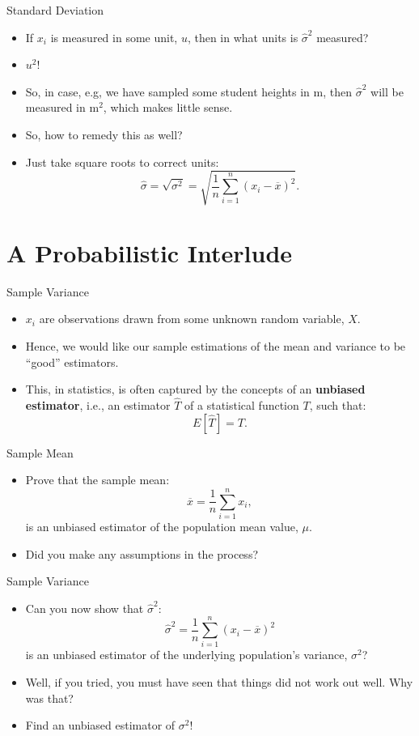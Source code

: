 \documentclass[aspectratio=169, 12pt, xcolor=table]{beamer}
\begin{document}
	\begin{frame}{Standard Deviation}
		\begin{itemize}
			\item If $x_i$ is measured in some unit, $u$, then in what units is $\hat{\sigma}^2$ measured?\pause
			\item $u^2$!\pause
			\item So, in case, e.g, we have sampled some student heights in $\si{\metre}$, then $\hat{\sigma}^2$ will be measured in $\si{\metre^2}$, which makes little sense.
			\item So, how to remedy this as well?\pause
			\item Just take square roots to correct units:
			\[\hat{\sigma}=\sqrt{\sigma^2}=\sqrt{\frac{1}{n}\sum_{i=1}^n(x_i-\overline{x})^2}.\]
		\end{itemize}
	\end{frame}


	\section{A Probabilistic Interlude}

	\sectionframe

	\begin{frame}{Sample Variance}
		\begin{itemize}
			\item $x_i$ are observations drawn from some unknown random variable, $X$.
			\item Hence, we would like our sample estimations of the mean and variance to be ``good'' estimators.
			\item This, in statistics, is often captured by the concepts of an \textbf{unbiased estimator}, i.e., an estimator $\hat{T}$ of a statistical function $T$, such that:
			\[E[\hat{T}]=T.\]
		\end{itemize}
	\end{frame}

	\begin{frame}{Sample Mean}
		\begin{itemize}
			\item Prove that the sample mean:
			\[\overline{x}=\frac{1}{n}\sum_{i=1}^nx_i,\]
			is an unbiased estimator of the population mean value, $\mu$.
			\item Did you make any assumptions in the process?
		\end{itemize}
	\end{frame}

	\begin{frame}{Sample Variance}
		\begin{itemize}
			\item Can you now show that $\hat{\sigma}^2$:
			\[\hat{\sigma}^2=\frac{1}{n}\sum_{i=1}^n(x_i-\overline{x})^2\]
			is an unbiased estimator of the underlying population's variance, $\sigma^2$?\pause
			\item Well, if you tried, you must have seen that things did not work out well. Why was that?\pause
			\item Find an unbiased estimator of $\sigma^2$!
		\end{itemize}
	\end{frame}
\end{document}

